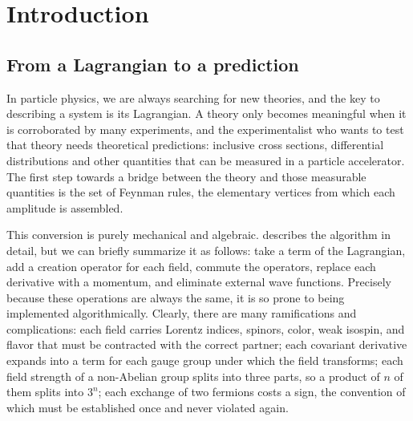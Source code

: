 
\chapter{Introduction}
\label{ch:introduction}

\section{From a Lagrangian to a prediction}
\label{sec:intro-motivation}

In particle physics, we are always searching for new theories, and the key to describing a system is its Lagrangian. A theory only becomes meaningful when it is corroborated by many experiments, and the experimentalist who wants to test that theory needs theoretical predictions: inclusive cross sections, differential distributions and other quantities that can be measured in a particle accelerator. The first step towards a bridge between the theory and those measurable quantities is the set of Feynman rules, the elementary vertices from which each amplitude is assembled.

This conversion is purely mechanical and algebraic.  describes the algorithm in detail, but we can briefly summarize it as follows: take a term of the Lagrangian, add a creation operator for each field, commute the operators, replace each derivative with a momentum, and eliminate external wave functions. Precisely because these operations are always the same, it is so prone to being implemented algorithmically. Clearly, there are many ramifications and complications: each field carries Lorentz indices, spinors, color, weak isospin, and flavor that must be contracted with the correct partner; each covariant derivative expands into a term for each gauge group under which the field transforms; each field strength of a non-Abelian group splits into three parts, so a product of $n$ of them splits into $3^n$; each exchange of two fermions costs a sign, the convention of which must be established once and never violated again.

